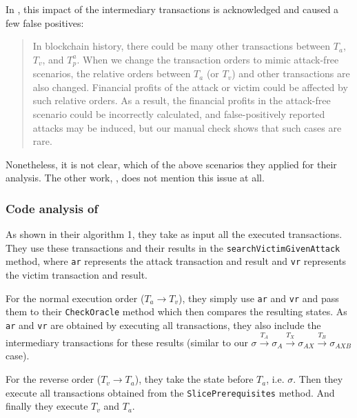 \documentclass[draft,final]{vutinfth} %
\begin{document}
In \cite{zhang_combatting_2023}, this impact of the intermediary transactions is acknowledged and caused a few false positives:

\begin{quote}
    In blockchain history, there could be many other transactions between $T_a$, $T_v$, and $T_p^a$. When we change the transaction orders to mimic attack-free scenarios, the relative orders between $T_a$ (or $T_v$) and other transactions are also changed. Financial profits of the attack or victim could be affected by such relative orders. As a result, the financial profits in the attack-free scenario could be incorrectly calculated, and false-positively reported attacks may be induced, but our manual check shows that such cases are rare.
\end{quote}

Nonetheless, it is not clear, which of the above scenarios they applied for their analysis. The other work, \cite{torres_frontrunner_2021}, does not mention this issue at all.


\subsubsection{Code analysis of \cite{zhang_combatting_2023}}


As shown in their algorithm 1, they take as input all the executed transactions. They use these transactions and their results in the \verb|searchVictimGivenAttack| method, where \verb|ar| represents the attack transaction and result and \verb|vr| represents the victim transaction and result.

For the normal execution order ($T_a \rightarrow T_v$), they simply use \verb|ar| and \verb|vr| and pass them to their \verb|CheckOracle| method which then compares the resulting states. As \verb|ar| and \verb|vr| are obtained by executing all transactions, they also include the intermediary transactions for these results (similar to our $\sigma \xrightarrow{T_A} \sigma_A \xrightarrow{T_X} \sigma_{AX} \xrightarrow{T_B} \sigma_{AXB}$ case).

For the reverse order ($T_v \rightarrow T_a$), they take the state before $T_a$, i.e. $\sigma$. Then they execute all transactions obtained from the \verb|SlicePrerequisites| method. And finally they execute $T_v$ and $T_a$.
\end{document}

